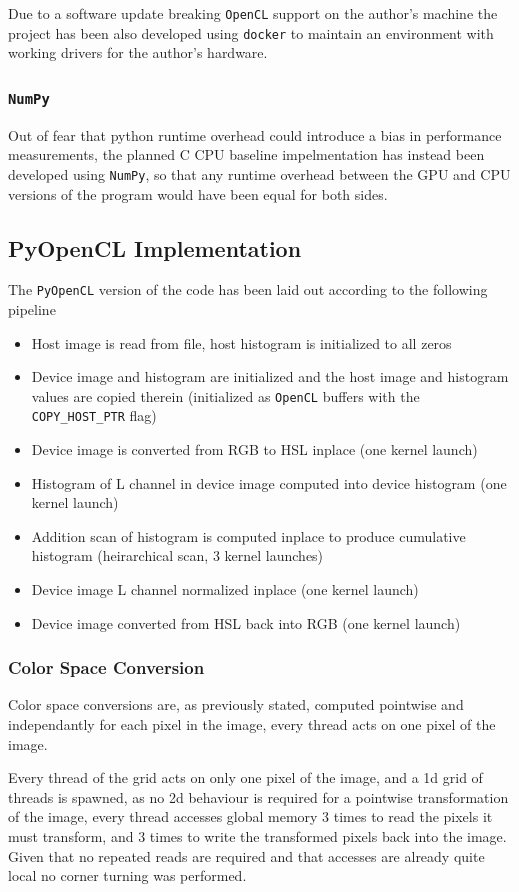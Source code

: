\documentclass[11pt]{article}
\begin{document}
Due to a software update breaking \texttt{OpenCL} support on the author's machine the project has been also developed using \texttt{docker} to maintain an environment with working drivers for the author's hardware.
\subsubsection{\texttt{NumPy}}
\label{sec:org5637768}
Out of fear that python runtime overhead could introduce a bias in performance measurements, the planned C CPU baseline impelmentation has instead been developed using \texttt{NumPy}, so that any runtime overhead between the GPU and CPU versions of the program would have been equal for both sides.
\subsection{PyOpenCL Implementation}
\label{sec:org4d45000}
The \texttt{PyOpenCL} version of the code has been laid out according to the following pipeline
\begin{itemize}
\item Host image is read from file, host histogram is initialized to all zeros
\item Device image and histogram are initialized and the host image and histogram values are copied therein (initialized as \texttt{OpenCL} buffers with the \texttt{COPY\_HOST\_PTR} flag)
\item Device image is converted from RGB to HSL inplace (one kernel launch)
\item Histogram of L channel in device image computed into device histogram (one kernel launch)
\item Addition scan of histogram is computed inplace to produce cumulative histogram (heirarchical scan, 3 kernel launches)
\item Device image L channel normalized inplace (one kernel launch)
\item Device image converted from HSL back into RGB (one kernel launch)
\end{itemize}
\subsubsection{Color Space Conversion}
\label{sec:org8b6b0e7}
Color space conversions are, as previously stated, computed pointwise and independantly for each pixel in the image, every thread acts on one pixel of the image.

Every thread of the grid acts on only one pixel of the image, and a 1d grid of threads is spawned, as no 2d behaviour is required for a pointwise transformation of the image, every thread accesses global memory 3 times to read the pixels it must transform, and 3 times to write the transformed pixels back into the image. Given that no repeated reads are required and that accesses are already quite local no corner turning was performed.
\end{document}
